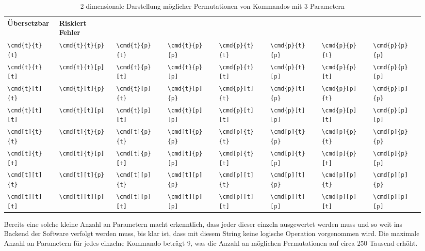 \begin{table}[h!]
    \centering
    \begin{tabularx}{\textwidth}{X|XXXXXXX}
        \toprule
        Übersetzbar & Riskiert Fehler & & & & & &\\
        \midrule
            \verb|\cmd{t}{t}{t}| & \verb|\cmd{t}{t}{p}| & \verb|\cmd{t}{p}{t}| & \verb|\cmd{t}{p}{p}| & \verb|\cmd{p}{t}{t}| & \verb|\cmd{p}{t}{p}| & \verb|\cmd{p}{p}{t}| & \verb|\cmd{p}{p}{p}|\\
            \verb|\cmd{t}{t}[t]| & \verb|\cmd{t}{t}[p]| & \verb|\cmd{t}{p}[t]| & \verb|\cmd{t}{p}[p]| & \verb|\cmd{p}{t}[t]| & \verb|\cmd{p}{t}[p]| & \verb|\cmd{p}{p}[t]| & \verb|\cmd{p}{p}[p]|\\
            \verb|\cmd{t}[t]{t}| & \verb|\cmd{t}[t]{p}| & \verb|\cmd{t}[p]{t}| & \verb|\cmd{t}[p]{p}| & \verb|\cmd{p}[t]{t}| & \verb|\cmd{p}[t]{p}| & \verb|\cmd{p}[p]{t}| & \verb|\cmd{p}[p]{p}|\\
            \verb|\cmd{t}[t][t]| & \verb|\cmd{t}[t][p]| & \verb|\cmd{t}[p][t]| & \verb|\cmd{t}[p][p]| & \verb|\cmd{p}[t][t]| & \verb|\cmd{p}[t][p]| & \verb|\cmd{p}[p][t]| & \verb|\cmd{p}[p][p]|\\
            \verb|\cmd[t]{t}{t}| & \verb|\cmd[t]{t}{p}| & \verb|\cmd[t]{p}{t}| & \verb|\cmd[t]{p}{p}| & \verb|\cmd[p]{t}{t}| & \verb|\cmd[p]{t}{p}| & \verb|\cmd[p]{p}{t}| & \verb|\cmd[p]{p}{p}|\\
            \verb|\cmd[t]{t}[t]| & \verb|\cmd[t]{t}[p]| & \verb|\cmd[t]{p}[t]| & \verb|\cmd[t]{p}[p]| & \verb|\cmd[p]{t}[t]| & \verb|\cmd[p]{t}[p]| & \verb|\cmd[p]{p}[t]| & \verb|\cmd[p]{p}[p]|\\
            \verb|\cmd[t][t]{t}| & \verb|\cmd[t][t]{p}| & \verb|\cmd[t][p]{t}| & \verb|\cmd[t][p]{p}| & \verb|\cmd[p][t]{t}| & \verb|\cmd[p][t]{p}| & \verb|\cmd[p][p]{t}| & \verb|\cmd[p][p]{p}|\\
            \verb|\cmd[t][t][t]| & \verb|\cmd[t][t][p]| & \verb|\cmd[t][p][t]| & \verb|\cmd[t][p][p]| & \verb|\cmd[p][t][t]| & \verb|\cmd[p][t][p]| & \verb|\cmd[p][p][t]| & \verb|\cmd[p][p][p]|\\
        \bottomrule
    \end{tabularx}
    \caption{2-dimensionale Darstellung möglicher Permutationen von Kommandos mit 3 Parametern}\label{tab:problems:exampleParameter}
\end{table}
Bereits eine solche kleine Anzahl an Parametern macht erkenntlich, dass jeder dieser einzeln ausgewertet werden muss und so weit ins Backend der Software verfolgt werden muss, bis klar ist, dass mit diesem String keine logische Operation vorgenommen wird. Die maximale Anzahl an Parametern für jedes einzelne Kommando beträgt 9, was die Anzahl an möglichen Permutationen auf circa 250 Tausend erhöht.

